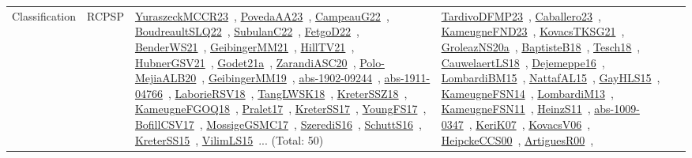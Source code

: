{\begin{longtable}{lp{3cm}>{\raggedright\arraybackslash}p{6cm}>{\raggedright\arraybackslash}p{6cm}>{\raggedright\arraybackslash}p{8cm}}
Classification & RCPSP & \href{works/YuraszeckMCCR23.pdf}{YuraszeckMCCR23}~\cite{YuraszeckMCCR23}, \href{works/PovedaAA23.pdf}{PovedaAA23}~\cite{PovedaAA23}, \href{works/CampeauG22.pdf}{CampeauG22}~\cite{CampeauG22}, \href{works/BoudreaultSLQ22.pdf}{BoudreaultSLQ22}~\cite{BoudreaultSLQ22}, \href{works/SubulanC22.pdf}{SubulanC22}~\cite{SubulanC22}, \href{works/FetgoD22.pdf}{FetgoD22}~\cite{FetgoD22}, \href{works/BenderWS21.pdf}{BenderWS21}~\cite{BenderWS21}, \href{works/GeibingerMM21.pdf}{GeibingerMM21}~\cite{GeibingerMM21}, \href{works/HillTV21.pdf}{HillTV21}~\cite{HillTV21}, \href{works/HubnerGSV21.pdf}{HubnerGSV21}~\cite{HubnerGSV21}, \href{works/Godet21a.pdf}{Godet21a}~\cite{Godet21a}, \href{works/ZarandiASC20.pdf}{ZarandiASC20}~\cite{ZarandiASC20}, \href{works/Polo-MejiaALB20.pdf}{Polo-MejiaALB20}~\cite{Polo-MejiaALB20}, \href{works/GeibingerMM19.pdf}{GeibingerMM19}~\cite{GeibingerMM19}, \href{works/abs-1902-09244.pdf}{abs-1902-09244}~\cite{abs-1902-09244}, \href{works/abs-1911-04766.pdf}{abs-1911-04766}~\cite{abs-1911-04766}, \href{works/LaborieRSV18.pdf}{LaborieRSV18}~\cite{LaborieRSV18}, \href{works/TangLWSK18.pdf}{TangLWSK18}~\cite{TangLWSK18}, \href{works/KreterSSZ18.pdf}{KreterSSZ18}~\cite{KreterSSZ18}, \href{works/KameugneFGOQ18.pdf}{KameugneFGOQ18}~\cite{KameugneFGOQ18}, \href{works/Pralet17.pdf}{Pralet17}~\cite{Pralet17}, \href{works/KreterSS17.pdf}{KreterSS17}~\cite{KreterSS17}, \href{works/YoungFS17.pdf}{YoungFS17}~\cite{YoungFS17}, \href{works/BofillCSV17.pdf}{BofillCSV17}~\cite{BofillCSV17}, \href{works/MossigeGSMC17.pdf}{MossigeGSMC17}~\cite{MossigeGSMC17}, \href{works/SzerediS16.pdf}{SzerediS16}~\cite{SzerediS16}, \href{works/SchuttS16.pdf}{SchuttS16}~\cite{SchuttS16}, \href{works/KreterSS15.pdf}{KreterSS15}~\cite{KreterSS15}, \href{works/VilimLS15.pdf}{VilimLS15}~\cite{VilimLS15}... (Total: 50) & \href{works/TardivoDFMP23.pdf}{TardivoDFMP23}~\cite{TardivoDFMP23}, \href{works/Caballero23.pdf}{Caballero23}~\cite{Caballero23}, \href{works/KameugneFND23.pdf}{KameugneFND23}~\cite{KameugneFND23}, \href{works/KovacsTKSG21.pdf}{KovacsTKSG21}~\cite{KovacsTKSG21}, \href{works/GroleazNS20a.pdf}{GroleazNS20a}~\cite{GroleazNS20a}, \href{works/BaptisteB18.pdf}{BaptisteB18}~\cite{BaptisteB18}, \href{works/Tesch18.pdf}{Tesch18}~\cite{Tesch18}, \href{works/CauwelaertLS18.pdf}{CauwelaertLS18}~\cite{CauwelaertLS18}, \href{works/Dejemeppe16.pdf}{Dejemeppe16}~\cite{Dejemeppe16}, \href{works/LombardiBM15.pdf}{LombardiBM15}~\cite{LombardiBM15}, \href{works/NattafAL15.pdf}{NattafAL15}~\cite{NattafAL15}, \href{works/GayHLS15.pdf}{GayHLS15}~\cite{GayHLS15}, \href{works/KameugneFSN14.pdf}{KameugneFSN14}~\cite{KameugneFSN14}, \href{works/LombardiM13.pdf}{LombardiM13}~\cite{LombardiM13}, \href{works/KameugneFSN11.pdf}{KameugneFSN11}~\cite{KameugneFSN11}, \href{works/HeinzS11.pdf}{HeinzS11}~\cite{HeinzS11}, \href{works/abs-1009-0347.pdf}{abs-1009-0347}~\cite{abs-1009-0347}, \href{works/KeriK07.pdf}{KeriK07}~\cite{KeriK07}, \href{works/KovacsV06.pdf}{KovacsV06}~\cite{KovacsV06}, \href{works/HeipckeCCS00.pdf}{HeipckeCCS00}~\cite{HeipckeCCS00}, \href{works/ArtiguesR00.pdf}{ArtiguesR00}~\cite{ArtiguesR00}, 
\end{longtable}}

